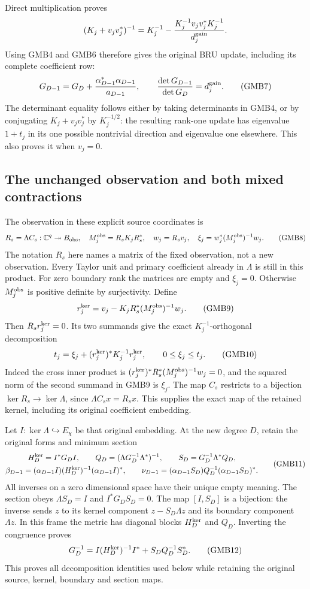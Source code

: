 \documentclass[11pt,a4paper]{article}
\begin{document}
Direct multiplication proves
\[
 (K_j+v_jv_j^*)^{-1}
 =K_j^{-1}-\frac{K_j^{-1}v_jv_j^*K_j^{-1}}{d_j^{\rm gain}}.
\]
Using GMB4 and GMB6 therefore gives the original BRU update,
including its complete coefficient row:
\[
 G_{D-1}=G_D+\frac{\alpha_{D-1}^*\alpha_{D-1}}{a_{D-1}},
 \qquad
 \frac{\det G_{D-1}}{\det G_D}=d_j^{\rm gain}.
 \tag{GMB7}
\]
The determinant equality follows either by taking determinants
in GMB4, or by conjugating $K_j+v_jv_j^*$ by $K_j^{-1/2}$:
the resulting rank-one update has eigenvalue $1+t_j$ in its
one possible nontrivial direction and eigenvalue one elsewhere.
This also proves it when $v_j=0$.

\subsection{The unchanged observation and both mixed contractions}
The observation in these explicit source coordinates is
\[
 R_s=\Lambda C_s:\mathbb C^q\twoheadrightarrow B_{\rm obs},
 \quad M_j^{\rm obs}=R_sK_jR_s^*,\quad w_j=R_sv_j,\quad
 \xi_j=w_j^*(M_j^{\rm obs})^{-1}w_j.
 \tag{GMB8}
\]
The notation $R_s$ here names a matrix of the fixed observation,
not a new observation. Every Taylor unit and primary coefficient
already in $\Lambda$ is still in this product. For zero boundary
rank the matrices are empty and $\xi_j=0$. Otherwise
$M_j^{\rm obs}$ is positive definite by surjectivity. Define
\[
 r_j^{\rm ker}=v_j-K_jR_s^*(M_j^{\rm obs})^{-1}w_j.
 \tag{GMB9}
\]
Then $R_sr_j^{\rm ker}=0$. Its two summands give the exact
$K_j^{-1}$-orthogonal decomposition
\[
 t_j=\xi_j+
       (r_j^{\rm ker})^*K_j^{-1}r_j^{\rm ker},\qquad
 0\leq\xi_j\leq t_j.
 \tag{GMB10}
\]
Indeed the cross inner product is
$(r_j^{\rm ker})^*R_s^*(M_j^{\rm obs})^{-1}w_j=0$, and the
squared norm of the second summand in GMB9 is $\xi_j$.
The map $C_s$ restricts to a bijection
$\ker R_s\to\ker\Lambda$, since
$\Lambda C_sx=R_sx$. This supplies the exact map of the retained
kernel, including its original coefficient embedding.

Let $I:\ker\Lambda\hookrightarrow E_\chi$ be that original
embedding. At the new degree $D$, retain the original forms and
minimum section
\[
\begin{gathered}
 H_D^{\rm ker}=I^*G_DI,\qquad
 Q_D=(\Lambda G_D^{-1}\Lambda^*)^{-1},\qquad
 S_D=G_D^{-1}\Lambda^*Q_D,\\
 \beta_{D-1}=(\alpha_{D-1}I)(H_D^{\rm ker})^{-1}
                                  (\alpha_{D-1}I)^*,\qquad
 \nu_{D-1}=(\alpha_{D-1}S_D)Q_D^{-1}
                                  (\alpha_{D-1}S_D)^*.
\end{gathered}\tag{GMB11}
\]
All inverses on a zero dimensional space have their unique empty
meaning. The section obeys $\Lambda S_D=I$ and $I^*G_DS_D=0$.
The map $[I,S_D]$ is a bijection: the inverse sends $z$ to its
kernel component $z-S_D\Lambda z$ and its boundary component
$\Lambda z$. In this frame the metric has diagonal blocks
$H_D^{\rm ker}$ and $Q_D$. Inverting the congruence proves
\[
 G_D^{-1}=I(H_D^{\rm ker})^{-1}I^*
                       +S_DQ_D^{-1}S_D^*.
 \tag{GMB12}
\]
This proves all decomposition identities used below while
retaining the original source, kernel, boundary and section maps.
\end{document}
